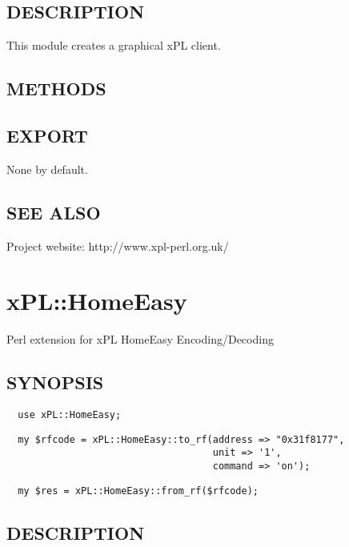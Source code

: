 \subsection*{DESCRIPTION\label{xPL::Gtk2Client_DESCRIPTION}}


This module creates a graphical xPL client.

\subsection*{METHODS\label{xPL::Gtk2Client_METHODS}}
\subsection*{EXPORT\label{xPL::Gtk2Client_EXPORT}}


None by default.

\subsection*{SEE ALSO\label{xPL::Gtk2Client_SEE_ALSO}}


Project website: http://www.xpl-perl.org.uk/

\section{xPL::HomeEasy\label{xPL::HomeEasy}}


Perl extension for xPL HomeEasy Encoding/Decoding

\subsection*{SYNOPSIS\label{xPL::HomeEasy_SYNOPSIS}}
\begin{verbatim}
  use xPL::HomeEasy;
\end{verbatim}
\begin{verbatim}
  my $rfcode = xPL::HomeEasy::to_rf(address => "0x31f8177",
                                    unit => '1',
                                    command => 'on');
\end{verbatim}
\begin{verbatim}
  my $res = xPL::HomeEasy::from_rf($rfcode);
\end{verbatim}
\subsection*{DESCRIPTION\label{xPL::HomeEasy_DESCRIPTION}}



